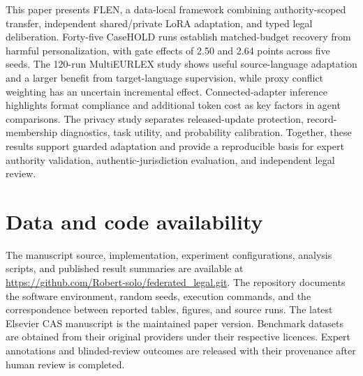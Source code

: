 \documentclass[a4paper,fleqn]{cas-sc}
\begin{document}
This paper presents FLEN, a data-local framework combining authority-scoped transfer, independent shared/private LoRA adaptation, and typed legal deliberation. Forty-five CaseHOLD runs establish matched-budget recovery from harmful personalization, with gate effects of 2.50 and 2.64 points across five seeds. The 120-run MultiEURLEX study shows useful source-language adaptation and a larger benefit from target-language supervision, while proxy conflict weighting has an uncertain incremental effect. Connected-adapter inference highlights format compliance and additional token cost as key factors in agent comparisons. The privacy study separates released-update protection, record-membership diagnostics, task utility, and probability calibration. Together, these results support guarded adaptation and provide a reproducible basis for expert authority validation, authentic-jurisdiction evaluation, and independent legal review.

\section*{Data and code availability}
The manuscript source, implementation, experiment configurations, analysis scripts, and published result summaries are available at \url{https://github.com/Robert-solo/federated_legal.git}. The repository documents the software environment, random seeds, execution commands, and the correspondence between reported tables, figures, and source runs. The latest Elsevier CAS manuscript is the maintained paper version. Benchmark datasets are obtained from their original providers under their respective licences. Expert annotations and blinded-review outcomes are released with their provenance after human review is completed.





\end{document}
